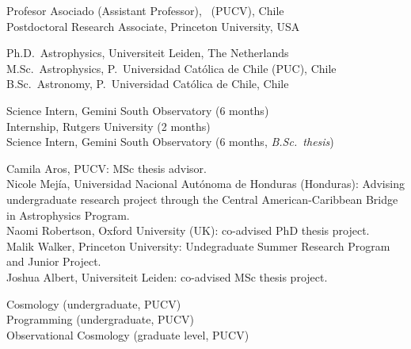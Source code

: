 \documentclass[11pt]{article}
\begin{document}

\noindent
{} Profesor Asociado (Assistant Professor), \pucv\ (PUCV), Chile\\
 Postdoctoral Research Associate, Princeton University, USA



\noindent
{} Ph.D.~Astrophysics, Universiteit Leiden, The Netherlands\\
 M.Sc.~Astrophysics, P.~Universidad Cat\'olica de Chile (PUC), Chile\\
 B.Sc.~Astronomy, P.~Universidad Cat\'olica de Chile, Chile



\noindent
{} Science Intern, Gemini South Observatory (6 months)\\
 Internship, Rutgers University (2 months)\\
 Science Intern, Gemini South Observatory (6 months, \emph{B.Sc.\ thesis})\\




\noindent
{} Camila Aros, PUCV: MSc thesis advisor.\\
 Nicole Mej\'ia, Universidad Nacional Aut\'onoma de Honduras (Honduras): Advising undergraduate
    research project through the Central American-Caribbean Bridge in Astrophysics Program.\\
 Naomi Robertson, Oxford University (UK): co-advised PhD thesis project.\\
 Malik Walker, Princeton University: Undegraduate Summer Research Program and Junior Project.\\
 Joshua Albert, Universiteit Leiden: co-advised MSc thesis project. 

\pagebreak


\noindent
{} Cosmology (undergraduate, PUCV)\\
 Programming (undergraduate, PUCV)\\
 Observational Cosmology (graduate level, PUCV)
\end{document}
